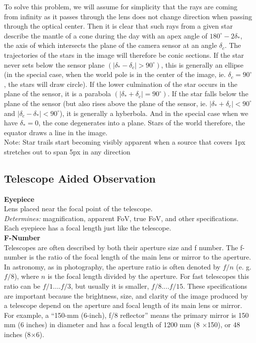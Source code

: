 \documentclass[a4paper,12pt]{extarticle}
\begin{document}
\begin{enumerate}
{\color{blue}
To solve this problem, we will assume for simplicity that the rays are coming from infinity as it passes through the lens does not change direction when passing through the optical center. Then it is clear that such rays from a given star describe the mantle of a cone during the day
with an apex angle of $180^\circ - 2\delta_\ast$, the axis of which intersects the plane of the camera sensor at an angle
$\delta_c$. The trajectories of the stars in the image will therefore be conic sections. If the star never sets
below the sensor plane $(|\delta_\ast-\delta_c|> 90^\circ)$, this is generally an ellipse (in the special case, when the world pole is in the center of the image, ie. $\delta_c = 90^\circ$, the stars will draw circle). If the lower culmination of the star occurs in the plane of the sensor, it is a parabola  $(|\delta_\ast+\delta_c|=90^\circ)$. If the star falls below the plane of the sensor (but also rises above
the plane of the sensor, ie.  $|\delta_\ast +\delta_c|< 90^\circ$ and  $|\delta_c- \delta_\ast|< 90^\circ$), it is generally a hyberbola. And in the special case when we have $\delta_\ast = 0$, the cone degenerates into a plane. Stars of the world therefore, the equator draws a line in the image.\\

Note: Star trails start becoming visibly apparent when a source that covers 1px stretches out to span 5px in any direction}
\end{enumerate}

\clearpage
\subsection{Telescope Aided Observation}
\textbf{Eyepiece}\\ 

Lens placed near the focal point of the telescope.\\
\textit{Determines:} magnification, apparent FoV, true FoV, and other specifications. Each eyepiece has a focal length just like the telescope.\\


\textbf{F-Number}\\ 

Telescopes are often described by both their aperture size and f number. The f-number is the ratio of the focal length of the main lens or mirror to the aperture. In astronomy, as in photography, the aperture ratio is often denoted by $f/n$ (e. g. $f/8$), where $n$ is the focal length divided by the aperture. For fast telescopes this ratio can be $f/1. . . . f/3$, but usually it is smaller, $f/8. . . . f/15$. These specifications are important because the brightness, size, and clarity of the image produced by a telescope depend on the aperture and focal length of its main lens or mirror. For example, a “150-mm (6-inch), f/8 reflector” means the primary mirror is 150 mm (6 inches) in diameter and has a focal length of 1200 mm (8 $\times$150), or 48 inches (8$\times$6).\\
\end{document}
